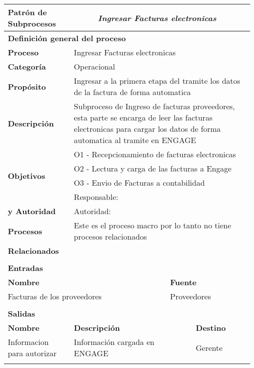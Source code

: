 \begin{longtable}{|llrrrrrr|}
	\hline
	\multicolumn{2}{|l|}{\textbf{Patrón de Subprocesos}} & \multicolumn{6}{|l|}{\textit{Ingresar Facturas electronicas}} \\ \hline
	\multicolumn{8}{|l|}{\textbf{Definición general del proceso}} \\ \hline
	\textbf{Proceso} & \multicolumn{7}{|m{12cm}|}{Ingresar Facturas electronicas} \\ \hline
	\textbf{Categoría} & \multicolumn{7}{|m{12cm}|}{Operacional} \\ \hline
	\textbf{Propósito} & \multicolumn{7}{|m{12cm}|}{Ingresar a la primera etapa del tramite los datos de la factura de forma automatica} \\ \hline
    \textbf{Descripción} & \multicolumn{7}{|m{12cm}|}{Subproceso de Ingreso de facturas proveedores, esta parte se encarga de leer las facturas electronicas para cargar los datos de forma automatica al tramite en ENGAGE} \\ \hline
	\multirow{4}[6]{*}{\textbf{Objetivos}} 
		  & \multicolumn{7}{|l|}{O1 - Recepcionamiento de facturas electronicas} \\ \cline{2-8}
          & \multicolumn{7}{|l|}{O2 - Lectura y carga de las facturas a Engage } \\ \cline{2-8}
          & \multicolumn{7}{|l|}{O3 - Envio de Facturas a contabilidad} \\ \hline
    \multicolumn{1}{|l|}{\textbf{Responsabilidad}} 	& \multicolumn{7}{|l|}{Responsable: } \\
	\multicolumn{1}{|l|}{\textbf{y Autoridad}} 	& \multicolumn{7}{|l|}{Autoridad: } \\ \hline
    \multicolumn{1}{|l|}{\textbf{Procesos}} 	& \multicolumn{7}{|l|}{Este es el proceso macro por lo tanto no tiene procesos relacionados} \\
	\multicolumn{1}{|l|}{\textbf{Relacionados}} 	&  \multicolumn{7}{|l|}{} \\ \hline
          &       &       &       &       &       &       &  \\ \hline
    \multicolumn{8}{|l|}{\textbf{Entradas}} \\ \hline
    \multicolumn{5}{|l|}{\textbf{Nombre}}   & \multicolumn{3}{|l|}{\textbf{Fuente}} \\ \hline
    \multicolumn{5}{|l|}{Facturas de los proveedores} & \multicolumn{3}{|l|}{Proveedores} \\  \hline
       &       &       &       &       &       &       &  \\ \hline
    \multicolumn{8}{|l|}{\textbf{Salidas}} \\ \hline
    \textbf{Nombre} & \multicolumn{5}{|l|}{\textbf{Descripción}} & \multicolumn{2}{|l|}{\textbf{Destino}} \\ \hline
    Informacion para autorizar & \multicolumn{5}{|l|}{Información cargada en ENGAGE} & \multicolumn{2}{|l|}{Gerente} \\ \hline
       &       &       &       &       &       &       &  \\ \hline
	

\end{longtable}
